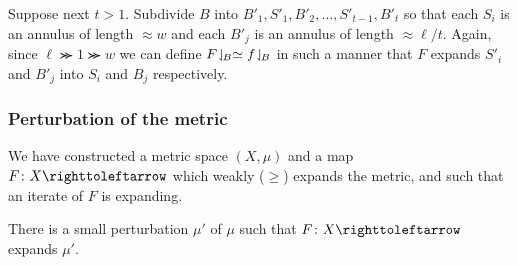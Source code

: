 \documentclass{amsart}
\begin{document}
Suppose next $t>1$. Subdivide $B$ into
$B'_1,S'_1,B'_2,\dots,S'_{t-1},B'_t$ so that each $S_i$ is an annulus
of length $\approx w$ and each $B'_j$ is an annulus of length
$\approx \ell/t$.  Again, since $\ell \ggcurly 1 \ggcurly w$ we can
define $F\!\downharpoonleft_{\!B} \simeq f\!\downharpoonleft_{\!B}$ in such a manner that $F$
expands $S'_i$ and $B'_j$ into $S_i$ and $B_j$ respectively.

\subsubsection{Perturbation of the metric}
We have constructed a metric space $(X,\mu)$ and a map
$F\colon X\selfmap$ which weakly ($\ge$) expands the metric, and such
that an iterate of $F$ is expanding.

\begin{lem}\label{lem:PertMetric}
  There is a small perturbation $\mu'$ of $\mu$ such that
  $F\colon X\selfmap$ expands $\mu'$.
\end{lem}
\end{document}
